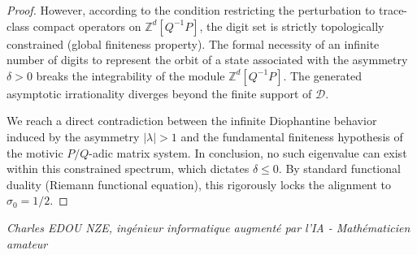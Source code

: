 \documentclass[
]{article}
\begin{document}
\begin{proof}
However, according to the condition restricting the perturbation to trace-class compact operators on $\mathbb{Z}^d[Q^{-1}P]$, the digit set is strictly topologically constrained (global finiteness property). The formal necessity of an infinite number of digits to represent the orbit of a state associated with the asymmetry $\delta > 0$ breaks the integrability of the module $\mathbb{Z}^d[Q^{-1}P]$. The generated asymptotic irrationality diverges beyond the finite support of $\mathcal{D}$.

We reach a direct contradiction between the infinite Diophantine behavior induced by the asymmetry $|\lambda| > 1$ and the fundamental finiteness hypothesis of the motivic $P/Q$-adic matrix system. In conclusion, no such eigenvalue can exist within this constrained spectrum, which dictates $\delta \le 0$. By standard functional duality (Riemann functional equation), this rigorously locks the alignment to $\sigma_0 = 1/2$.
\end{proof}

\vspace{1cm}
\begin{flushright}
\textit{Charles EDOU NZE, ingénieur informatique augmenté par l'IA - Mathématicien amateur}
\end{flushright}
\end{document}
